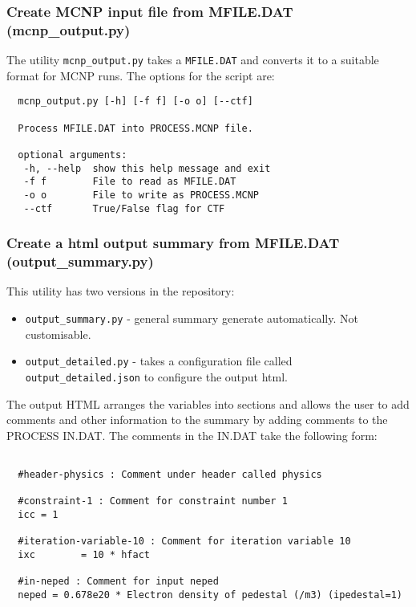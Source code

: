 \documentclass[11pt,a4paper]{article}
\begin{document}
\subsubsection{Create MCNP input file from MFILE.DAT (mcnp\_output.py)}

The utility \texttt{mcnp\_output.py} takes a \texttt{MFILE.DAT} and converts it to a suitable 
format for MCNP runs. The options for the script are:\\

\begin{mdframed}
 \begin{verbatim}
  mcnp_output.py [-h] [-f f] [-o o] [--ctf]

  Process MFILE.DAT into PROCESS.MCNP file.

  optional arguments:
   -h, --help  show this help message and exit
   -f f        File to read as MFILE.DAT
   -o o        File to write as PROCESS.MCNP
   --ctf       True/False flag for CTF
 \end{verbatim}
\end{mdframed}

\subsubsection{Create a html output summary from MFILE.DAT (output\_summary.py)}

This utility has two versions in the repository:
\begin{itemize}
  \item \texttt{output\_summary.py} - general summary generate automatically. Not customisable.
  \item \texttt{output\_detailed.py} - takes a configuration file called 
  \texttt{output\_detailed.json} to configure the output html.
\end{itemize}

The output HTML arranges the variables into sections and allows the user to add comments and 
other information to the summary by adding comments to the PROCESS IN.DAT. The comments in the 
IN.DAT take the following form:

\begin{mdframed}
 \begin{verbatim}
  
  #header-physics : Comment under header called physics

  #constraint-1 : Comment for constraint number 1
  icc = 1

  #iteration-variable-10 : Comment for iteration variable 10
  ixc        = 10 * hfact

  #in-neped : Comment for input neped
  neped = 0.678e20 * Electron density of pedestal (/m3) (ipedestal=1)

 \end{verbatim}
\end{mdframed}
\end{document}
